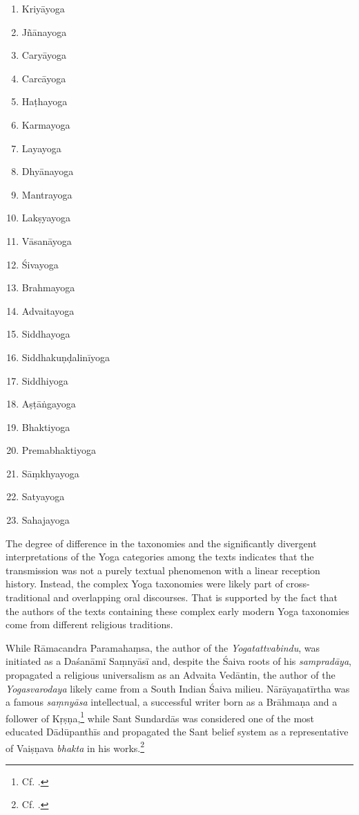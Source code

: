 \begin{enumerate}
\item Kriyāyoga
\item Jñānayoga
\item Caryāyoga
\item Carcāyoga
\item Haṭhayoga
\item Karmayoga
\item Layayoga
\item Dhyānayoga
\item Mantrayoga
\item Lakṣyayoga
\item Vāsanāyoga
\item Śivayoga
\item Brahmayoga
\item Advaitayoga
\item Siddhayoga
\item Siddhakuṇḍalinīyoga 
\item Siddhiyoga
\item Aṣṭāṅgayoga
\item Bhaktiyoga
\item Premabhaktiyoga
\item Sāṃkhyayoga
\item Satyayoga
\item Sahajayoga 
\end{enumerate}

The degree of difference in the taxonomies and the significantly divergent interpretations of the Yoga categories among the texts indicates that the transmission was not a purely textual phenomenon with a linear reception history. Instead, the complex Yoga taxonomies were likely part of cross-traditional and overlapping oral discourses. That is supported by the fact that the authors of the texts containing these complex early modern Yoga taxonomies come from different religious traditions.

While Rāmacandra Paramahaṃsa, the author of the \emph{Yogatattvabindu}, was initiated as a Daśanāmī Saṃnyāsī and, despite the Śaiva roots of his \textit{sampradāya}, propagated a religious universalism as an Advaita Vedāntin, the author of the \textit{Yogasvarodaya} likely came from a South Indian Śaiva milieu. Nārāyaṇatīrtha was a famous \textit{saṃnyāsa} intellectual, a successful writer born as a Brāhmaṇa and a follower of Kṛṣṇa,\footnote{Cf. \citeauthor[1993: 41]{endo1993}.} while Sant Sundardās was considered one of the most educated Dādūpanthīs and propagated the Sant belief system as a representative of Vaiṣṇava \textit{bhakta} in his works.\footnote{Cf. \citeauthor[2023: 84-87]{horstmann2023shrine}.}

